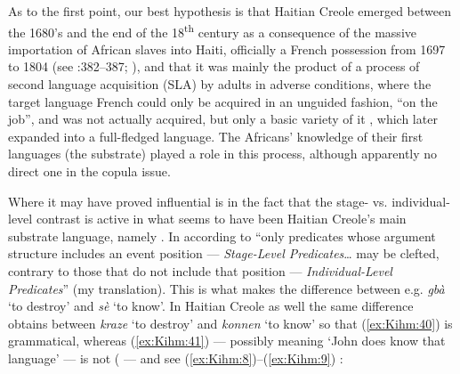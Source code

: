 \documentclass[output=paper]{langsci/langscibook}
\begin{document}
As to the first point, our best hypothesis is that Haitian Creole
emerged between the 1680's and the end of the 18\textsuperscript{th}
century as a consequence of the massive importation of African slaves
into Haiti, officially a French possession from 1697 to 1804 %
(see %
\citealt{Holm89}%
%
:382--387; %
\citealt{FaraclasWalicekEtAl2007}%
%
),
%
and that it was mainly the product
of a process of second language acquisition (SLA) by adults in adverse
conditions, where the target language French could only be acquired in
an unguided fashion, ``on the job'', and was not actually acquired, but
only a basic variety of it %
\citep{Klein1997b}, %
%
which later expanded
into a full-fledged language. The Africans' knowledge of their first
languages (the substrate) played a role in this process, although
apparently no direct one in the copula issue.

Where it may have proved influential is in the fact that the stage- vs.
individual-level contrast is active in what seems to have been Haitian
Creole's main substrate language, namely  %
\citep{Lefebvre98}%
%
. In
 according to %
\citet[63]{Ndayiragidje93} %
%
``only predicates whose
argument structure includes an event position --- \emph{Stage-Level
Predicates}\ldots{} may be clefted, contrary to those that do not
include that position --- \emph{Individual-Level Predicates}'' (my
translation). This is what makes the difference between e.g. \emph{gbà}
`to destroy' and \emph{sè} `to know'. In Haitian Creole as well the same
difference obtains between \emph{kraze} `to destroy' and \emph{konnen}
`to know' so that (\ref{ex:Kihm:40}) is grammatical, whereas (\ref{ex:Kihm:41}) --- possibly meaning
`John does know that language' --- is not %
(%
\citealt{Lefebvre90} %
%
 --- and see (\ref{ex:Kihm:8})--(\ref{ex:Kihm:9})%
%
:


\z
\end{document}
